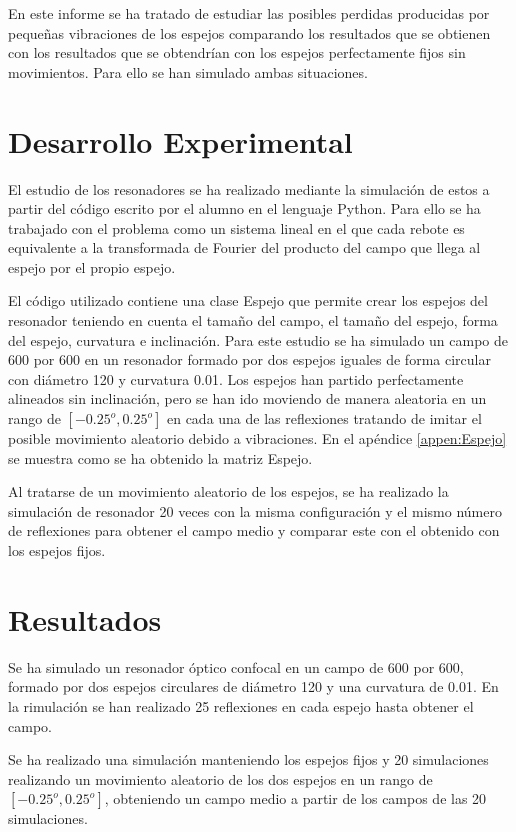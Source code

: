 \documentclass[twoside]{article}
\begin{document}
\begin{multicols}{2}
				En este informe se ha tratado de estudiar las posibles perdidas producidas por pequeñas vibraciones de los espejos comparando los resultados que se obtienen con los resultados que se obtendrían con los espejos perfectamente fijos sin movimientos. Para ello se han simulado ambas situaciones.

			\section{Desarrollo Experimental}

				El estudio de los resonadores se ha realizado mediante la simulación de estos a partir del código \cite{Resonador} escrito por el alumno en el lenguaje Python. Para ello se ha trabajado con el problema como un sistema lineal en el que cada rebote es equivalente a la transformada de Fourier del producto del campo que llega al espejo por el propio espejo.

				El código utilizado contiene una clase Espejo que permite crear los espejos del resonador teniendo en cuenta el tamaño del campo, el tamaño del espejo, forma del espejo, curvatura e inclinación. Para este estudio se ha simulado un campo de 600 por 600 en un resonador formado por dos espejos iguales de forma circular con diámetro 120 y curvatura 0.01. Los espejos han partido perfectamente alineados sin inclinación, pero se han ido moviendo de manera aleatoria en un rango de $[-0.25^o, 0.25^o]$ en cada una de las reflexiones tratando de imitar el posible movimiento aleatorio debido a vibraciones. En el apéndice \ref{appen:Espejo} se muestra como se ha obtenido la matriz Espejo.

				Al tratarse de un movimiento aleatorio de los espejos, se ha realizado la simulación de resonador 20 veces con la misma configuración y el mismo número de reflexiones para obtener el campo medio y comparar este con el obtenido con los espejos fijos.

			\section{Resultados}

				Se ha simulado un resonador óptico confocal en un campo de 600 por 600, formado por dos espejos circulares de diámetro 120 y una curvatura de 0.01. En la rimulación se han realizado 25 reflexiones en cada espejo hasta obtener el campo.

				Se ha realizado una simulación manteniendo los espejos fijos y 20 simulaciones realizando un movimiento aleatorio de los dos espejos en un rango de $[-0.25^o , 0.25^o]$, obteniendo un campo medio a partir de los campos de las 20 simulaciones.


\end{multicols}
\end{document}
